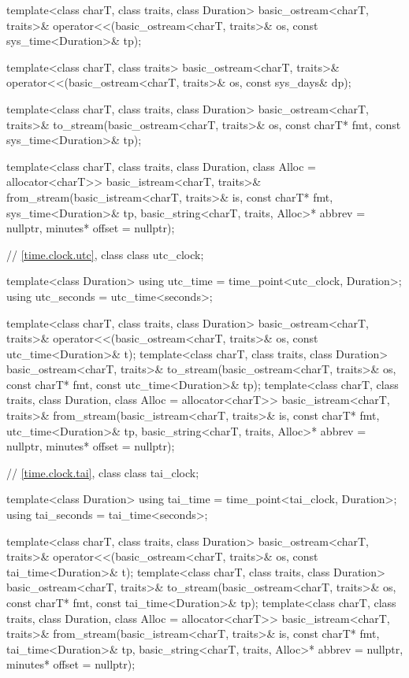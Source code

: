 \begin{codeblock}
{{    template<class charT, class traits, class Duration>
      basic_ostream<charT, traits>&
        operator<<(basic_ostream<charT, traits>& os, const sys_time<Duration>& tp);

    template<class charT, class traits>
      basic_ostream<charT, traits>&
        operator<<(basic_ostream<charT, traits>& os, const sys_days& dp);

    template<class charT, class traits, class Duration>
      basic_ostream<charT, traits>&
        to_stream(basic_ostream<charT, traits>& os, const charT* fmt,
                  const sys_time<Duration>& tp);

    template<class charT, class traits, class Duration, class Alloc = allocator<charT>>
      basic_istream<charT, traits>&
        from_stream(basic_istream<charT, traits>& is, const charT* fmt,
                    sys_time<Duration>& tp,
                    basic_string<charT, traits, Alloc>* abbrev = nullptr,
                    minutes* offset = nullptr);

    // \ref{time.clock.utc}, class 
    class utc_clock;

    template<class Duration>
      using utc_time  = time_point<utc_clock, Duration>;
    using utc_seconds = utc_time<seconds>;

    template<class charT, class traits, class Duration>
      basic_ostream<charT, traits>&
        operator<<(basic_ostream<charT, traits>& os, const utc_time<Duration>& t);
    template<class charT, class traits, class Duration>
      basic_ostream<charT, traits>&
        to_stream(basic_ostream<charT, traits>& os, const charT* fmt,
                  const utc_time<Duration>& tp);
    template<class charT, class traits, class Duration, class Alloc = allocator<charT>>
      basic_istream<charT, traits>&
        from_stream(basic_istream<charT, traits>& is, const charT* fmt,
                    utc_time<Duration>& tp,
                    basic_string<charT, traits, Alloc>* abbrev = nullptr,
                    minutes* offset = nullptr);

    // \ref{time.clock.tai}, class 
    class tai_clock;

    template<class Duration>
      using tai_time  = time_point<tai_clock, Duration>;
    using tai_seconds = tai_time<seconds>;

    template<class charT, class traits, class Duration>
      basic_ostream<charT, traits>&
        operator<<(basic_ostream<charT, traits>& os, const tai_time<Duration>& t);
    template<class charT, class traits, class Duration>
      basic_ostream<charT, traits>&
        to_stream(basic_ostream<charT, traits>& os, const charT* fmt,
                  const tai_time<Duration>& tp);
    template<class charT, class traits, class Duration, class Alloc = allocator<charT>>
      basic_istream<charT, traits>&
        from_stream(basic_istream<charT, traits>& is, const charT* fmt,
                    tai_time<Duration>& tp,
                    basic_string<charT, traits, Alloc>* abbrev = nullptr,
                    minutes* offset = nullptr);

}}
\end{codeblock}
